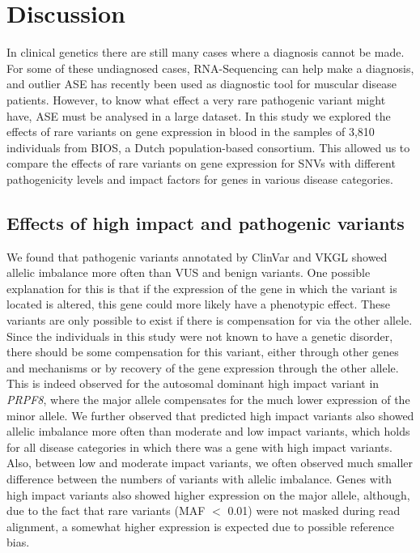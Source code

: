 \section{Discussion}

In clinical genetics there are still many cases where a diagnosis cannot be made\cite{diemenRapidTargetedGenomics2017}. For some of these undiagnosed cases, RNA-Sequencing can help make a diagnosis\cite{marco-pucheRNASeqPerspectivesImprove2019}, and outlier ASE has recently been used as diagnostic tool for muscular disease patients\cite{mohammadiGeneticRegulatoryVariation2019}. However, to know what effect a very rare pathogenic variant might have, ASE must be analysed in a large dataset. In this study we explored the effects of rare variants on gene expression in blood in the samples of 3,810 individuals from BIOS, a Dutch population-based consortium. This allowed us to compare the effects of rare variants on gene expression for SNVs with different pathogenicity levels and impact factors for genes in various disease categories.

\subsection{Effects of high impact and pathogenic variants}
We found that pathogenic variants annotated by ClinVar\cite{landrumClinVarImprovingAccess2018} and VKGL\cite{fokkemaDutchGenomeDiagnostic2019} showed allelic imbalance more often than VUS and benign variants. One possible explanation for this is that if the expression of the gene in which the variant is located is altered, this gene could more likely have a phenotypic effect. These variants are only possible to exist if there is compensation for via the other allele. Since the individuals in this study were not known to have a genetic disorder, there should be some compensation for this variant, either through other genes and mechanisms or by recovery of the gene expression through the other allele. This is indeed observed for the autosomal dominant high impact variant in \textit{PRPF8}, where the major allele compensates for the much lower expression of the minor allele. We further observed that predicted high impact variants also showed allelic imbalance more often than moderate and low impact variants, which holds for all disease categories in which there was a gene with high impact variants. Also, between low and moderate impact variants, we often observed much smaller difference between the numbers of variants with allelic imbalance. Genes with high impact variants also showed higher expression on the major allele, although, due to the fact that rare variants (MAF $<$ 0.01) were not masked during read alignment, a somewhat higher expression is expected due to possible reference bias.

